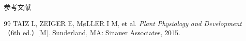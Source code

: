 \documentclass[aspectratio=169,10pt,fontset=fandol]{ctexbeamer}
\begin{document}
\begin{frame}[t,fragile]{参考文献}
\footnotesize
{\footnotesize
\begin{thebibliography}{99}
 TAIZ L, ZEIGER E, M{\o}LLER I M, et al. \emph{Plant Physiology and Development}（6th ed.）[M]. Sunderland, MA: Sinauer Associates, 2015.
\end{thebibliography}
}
\end{frame}
\end{document}
